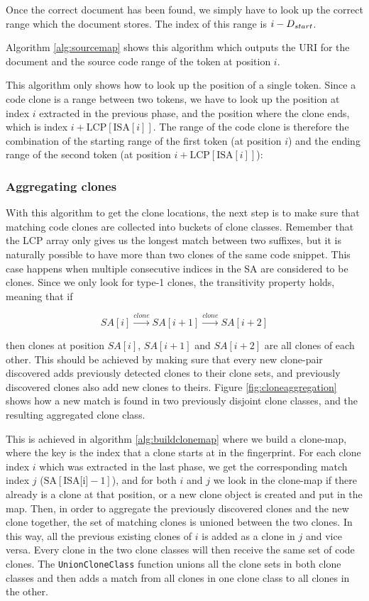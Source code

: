 Once the correct document has been found, we simply have to look up the correct range
which the document stores. The index of this range is $i -
{{D}_{start}}$.

Algorithm \ref{alg:sourcemap} shows this algorithm which outputs the URI for the document and
the source code range of the token at position $i$.

This algorithm only shows how to look up the position of a single token. Since a code
clone is a range between two tokens, we have to look up the position at index $i$
extracted in the previous phase, and the position where the clone ends, which is index $i
+ \text{LCP}[\text{ISA}[i]]$. The range of the code clone is therefore the combination of
the starting range of the first token (at position $i$) and the ending range of the second
token (at position $i + \text{LCP}[\text{ISA}[i]]$):

\subsubsection{Aggregating clones}

With this algorithm to get the clone locations, the next step is to make sure that
matching code clones are collected into buckets of clone classes. Remember that the LCP
array only gives us the longest match between two suffixes, but it is naturally possible
to have more than two clones of the same code snippet. This case happens when multiple
consecutive indices in the SA are considered to be clones. Since we only look for type-1
clones, the transitivity property holds, meaning that if

$$
SA[i] \xrightarrow{clone} SA[i+1] \xrightarrow{clone} SA[i + 2]
$$

then clones at position $SA[i]$, $SA[i+1]$ and $SA[i + 2]$ are all clones of each other.
This should be achieved by making sure that every new clone-pair discovered adds
previously detected clones to their clone sets, and previously discovered clones also add
new clones to theirs. Figure \ref{fig:cloneaggregation} shows how a new match is found in
two previously disjoint clone classes, and the resulting aggregated clone class.

This is achieved in algorithm \ref{alg:buildclonemap} where we build a clone-map, where
the key is the index that a clone starts at in the fingerprint. For each clone index $i$
which was extracted in the last phase, we get the corresponding match index $j$
($\text{SA}[\text{ISA[i]} - 1]$), and for both $i$ and $j$ we look in the clone-map if
there already is a clone at that position, or a new clone object is created and put in the
map. Then, in order to aggregate the previously discovered clones and the new clone
together, the set of matching clones is unioned between the two clones. In this way, all
the previous existing clones of $i$ is added as a clone in $j$ and vice versa. Every clone
in the two clone classes will then receive the same set of code clones. The
\verb|UnionCloneClass| function unions all the clone sets in both clone classes and then
adds a match from all clones in one clone class to all clones in the other.

